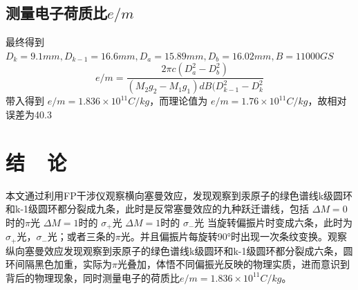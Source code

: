 \documentclass{buaaemp}
\begin{document}
\subsection{测量电子荷质比$e/m$}
最终得到 $D_k=9.1mm, D_{k-1}=16.6mm, D_a=15.89mm, D_b=16.02mm, B=11000GS$
\begin{equation}
    e/m=\frac{2 \pi c (D_a^2-D_b^2)}{(M_2 g_2-M_1 g_1)dB(D_{k-1}^2-D_{k}^2}
\end{equation}
带入得到 $e/m=1.836\times 10^{11} C/kg$，而理论值为 $e/m=1.76 \times 10^{11} C/kg$，故相对误差为40.3%
\section{结~~论}
本文通过利用FP干涉仪观察横向塞曼效应，发现观察到汞原子的绿色谱线k级圆环和k-1级圆环都分裂成九条，此时是反常塞曼效应的九种跃迁谱线，包括 $\Delta M=0$时的$
\pi$光  $\Delta M=1$时的 $\sigma_+$光 $\Delta M=1$时的 $\sigma_-$光 当旋转偏振片时变成六条，此时为$\sigma_+$光，$\sigma_-$光；或者三条的$
\pi$光。并且偏振片每旋转90°时出现一次条纹变换。观察纵向塞曼效应发现观察到汞原子的绿色谱线k级圆环和k-1级圆环都分裂成六条，圆环间隔黑色加重，实际为$
\pi$光叠加，体悟不同偏振光反映的物理实质，进而意识到背后的物理现象，同时测量电子的荷质比$e/m=1.836\times 10^{11} C/kg$。



\renewcommand\refname{\heiti\wuhao\centerline{参考文献}\global\def\refname{参考文献}}
\vskip 12pt

\let\OLDthebibliography\thebibliography
\renewcommand\thebibliography[1]{
  \OLDthebibliography{#1}
  \setlength{\parskip}{0pt}
  \setlength{\itemsep}{0pt plus 0.3ex}
}

{
\renewcommand{\baselinestretch}{0.9}
\liuhao


}
\end{document}
